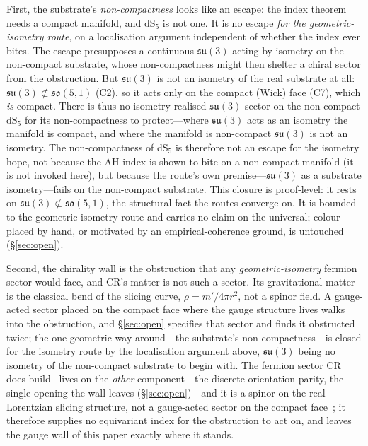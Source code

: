 \documentclass[11pt]{article}
\theoremstyle{plain}
\theoremstyle{remark}
\newcommand{\so}{\mathfrak{so}}
\newcommand{\su}{\mathfrak{su}}
\newcommand{\dS}{\mathrm{dS}}
\begin{document}
First, the substrate's \emph{non-compactness} looks like an escape: the index theorem needs a compact manifold, and $\dS_5$ is not one. It is no escape \emph{for the geometric-isometry route}, on a localisation argument independent of whether the index ever bites. The escape presupposes a continuous $\su(3)$ acting by isometry on the non-compact substrate, whose non-compactness might then shelter a chiral sector from the obstruction. But $\su(3)$ is not an isometry of the real substrate at all: $\su(3)\not\subset\so(5,1)$ (C2), so it acts only on the compact (Wick) face (C7), which \emph{is} compact. There is thus no isometry-realised $\su(3)$ sector on the non-compact $\dS_5$ for its non-compactness to protect---where $\su(3)$ acts as an isometry the manifold is compact, and where the manifold is non-compact $\su(3)$ is not an isometry. The non-compactness of $\dS_5$ is therefore not an escape for the isometry hope, not because the AH index is shown to bite on a non-compact manifold (it is not invoked here), but because the route's own premise---$\su(3)$ as a substrate isometry---fails on the non-compact substrate. This closure is proof-level: it rests on $\su(3)\not\subset\so(5,1)$, the structural fact the routes converge on. It is bounded to the geometric-isometry route and carries no claim on the universal; colour placed by hand, or motivated by an empirical-coherence ground, is untouched (\S\ref{sec:open}).

Second, the chirality wall is the obstruction that any \emph{geometric-isometry} fermion sector would face, and CR's matter is not such a sector. Its gravitational matter is the classical bend of the slicing curve, $\rho=m'/4\pi r^2$, not a spinor field. A gauge-acted sector placed on the compact face where the gauge structure lives walks into the obstruction, and \S\ref{sec:open} specifies that sector and finds it obstructed twice; the one geometric way around---the substrate's non-compactness---is closed for the isometry route by the localisation argument above, $\su(3)$ being no isometry of the non-compact substrate to begin with. The fermion sector CR does build~\cite{JanzenMatter} lives on the \emph{other} component---the discrete orientation parity, the single opening the wall leaves (\S\ref{sec:open})---and it is a spinor on the real Lorentzian slicing structure, not a gauge-acted sector on the compact face~\cite{JanzenMatter}; it therefore supplies no equivariant index for the obstruction to act on, and leaves the gauge wall of this paper exactly where it stands.
\end{document}
